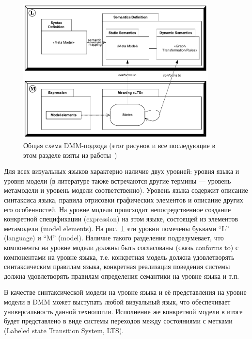 \documentclass[a5paper]{article}
\begin{document}
\begin{figure} [ht]
  \begin{center}
    \includegraphics[width=0.9\textwidth]{dmm-concept.png}
    \caption{Общая схема DMM-подхода (этот рисунок и все последующие в этом разделе взяты из работы~\cite{dmm2})}
    \label{fig3}
  \end{center}
\end{figure}

Для всех визуальных языков характерно наличие двух уровней: уровня языка и уровня модели (в литературе также встречаются другие термины --- уровень метамодели и уровень модели соответственно). Уровень языка содержит описание синтаксиса языка, правила отрисовки графических элементов и описание других его особенностей. На уровне модели происходит непосредственное создание конкретной спецификации (expression) на этом языке, состоящей из элементов метамодели (model elements). На рис.~\ref{fig3} эти уровни помечены буквами “L” (language) и “M” (model). Наличие такого разделения подразумевает, что компоненты на уровне модели должны быть согласованы (связь conforms to) с компонентами на уровне языка, т.е. конкретная модель должна удовлетворять синтаксическим правилам языка, конкретная реализация поведения системы должна удовлетворять правилам определения семантики на уровне языка и т.п.

В качестве синтаксической модели на уровне языка и её представления на уровне модели в DMM может выступать любой визуальный язык, что обеспечивает универсальность данной технологии. Исполнение же конкретной модели в итоге будет представлено в виде системы переходов между состояниями с метками (Labeled state Transition System, LTS).
\end{document}
